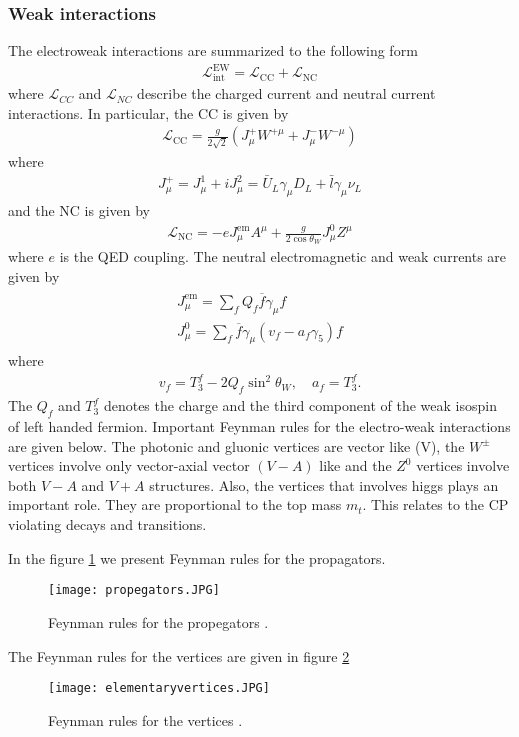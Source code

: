\subsubsection{Weak interactions}
The electroweak interactions are summarized to the following form
\begin{eqnarray}
\mathcal{L}_{\mathrm{int}}^{\mathrm{EW}}=\mathcal{L}_{\mathrm{CC}}+\mathcal{L}_{\mathrm{NC}}
\end{eqnarray}
where $\mathcal{L}_{CC}$ and $\mathcal{L}_{NC}$ describe the charged current and neutral current interactions. In particular, the CC is given by \cite{Buras:1998raa}
\begin{eqnarray}
\mathcal{L}_{\mathrm{CC}}=\frac{g}{2 \sqrt{2}}\left(J_{\mu}^{+} W^{+\mu}+J_{\mu}^{-} W^{-\mu}\right)
\end{eqnarray}
where 
\begin{eqnarray}
J_{\mu}^{+}=J^1_{\mu}+iJ^2_{\mu}=\bar{U}_L\gamma_{\mu}D_L+\bar{l}\gamma_{\mu}\nu_{L}
\end{eqnarray}
and the NC is given by
\begin{eqnarray}
\mathcal{L}_{\mathrm{NC}}=-e J_{\mu}^{\mathrm{em}} A^{\mu}+\frac{g}{2 \cos \theta_W} J_{\mu}^{0} Z^{\mu}
\end{eqnarray}
where $e$ is the QED coupling. The neutral electromagnetic and weak currents are given by
\begin{eqnarray}
\begin{array}{c}{J_{\mu}^{\mathrm{em}}=\sum_{f} Q_{f} \overline{f} \gamma_{\mu} f} \\ {J_{\mu}^{0}=\sum_{f} \overline{f} \gamma_{\mu}\left(v_{f}-a_{f} \gamma_{5}\right) f}\end{array}
\end{eqnarray}
where 
\begin{eqnarray}
v_{f}=T_{3}^{f}-2 Q_{f} \sin ^{2} \theta_W, \quad a_{f}=T_{3}^{f}.
\end{eqnarray}
The $Q_f$ and $T_3^f$ denotes the charge and the third component of the weak isospin of left handed fermion. Important Feynman rules for the electro-weak interactions are given below. The photonic and gluonic vertices are vector like (V), the $W^{\pm}$ vertices involve only vector-axial vector $(V-A)$ like and the $Z^0$ vertices involve both $V-A$ and $V+A$ structures. Also, the vertices that involves higgs plays an important role. They are proportional to the top mass $m_t$. This relates to the CP violating decays and transitions.\par
In the figure \ref{fig:elemPropegators} we present Feynman rules for the propagators. 
\begin{figure}[H]
\centering
\texttt{[image: propegators.JPG]}
\caption{\label{fig:elemPropegators}
Feynman rules for the propegators \cite{Buras:1998raa}.}
\end{figure}
The Feynman rules for the vertices are given in figure \ref{fig:elemVertices}
\begin{figure}[H]
\centering
\texttt{[image: elementaryvertices.JPG]}
\caption{\label{fig:elemVertices}
Feynman rules for the vertices \cite{Buras:1998raa}.}
\end{figure}

